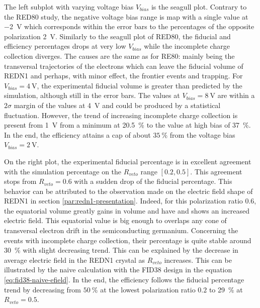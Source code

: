 The left subplot with varying voltage bias $V_{bias}$ is the seagull plot. Contrary to the RED80 study, the negative voltage bias range is map with a single value at \SI{-2}{\volt} which corresponds within the error bars to the percentages of the opposite polarization \SI{2}{\volt}. Similarly to the seagull plot of RED80, the fiducial and efficiency percentages drops at very low $V_{bias}$ while the incomplete charge collection diverges. The causes are the same as for RE80: mainly being the transversal trajectories of the electrons which can leave the fiducial volume of REDN1 and perhaps, with minor effect, the frontier events and trapping.
For $V_{bias}=\SI{4}{\volt}$, the  experimental fiducial volume is greater than predicted by the simulation, although still in the error bars.
The values at $V_{bias} = \SI{8}{\volt}$ are within a $2\sigma$ margin of the values at \SI{4}{\volt} and could be produced by a statistical fluctuation.
However, the trend of increasing incomplete charge collection is present from \SI{1}{\volt} from a minimum at \SI{20.5}{\percent} to the value at high bias of \SI{37}{\percent}.
In the end, the efficiency attains a cap of about $\SI{35}{\percent}$ from the voltage bias $V_{bias} = \SI{2}{\volt}$.

On the right plot, the experimental fiducial percentage is in excellent agreement with the simulation percentage on the $R_{veto}$ range $[0.2, 0.5]$. This agreement stops from $R_{veto} = 0.6$ with a sudden drop of the fiducial percentage. This behavior can be attributed to the observation made on the electric field shape of REDN1 in section \ref{par:redn1-presentation}. Indeed, for this polarization ratio $0.6$, the equatorial volume greatly gains in volume and have and shows an increased electric field. This equatorial value is big enough to overlaps any cone of transversal electron drift in the semiconducting germanium.
Concerning the events with incomplete charge collection, their percentage is quite stable around \SI{30}{\percent} with slight decreasing trend. This can be explained by the decrease in average electric field in the REDN1 crystal as $R_{veto}$ increases. This can be illustrated by the naive calculation with the FID38 design in the equation \ref{eq:fid38-naive-efield}. 
In the end, the efficiency follows the fiducial percentage trend by decreasing from $\SI{50}{\percent}$ at the lowest polarization ratio $0.2$ to \SI{29}{\percent} at $R_{veto}=0.5$.

